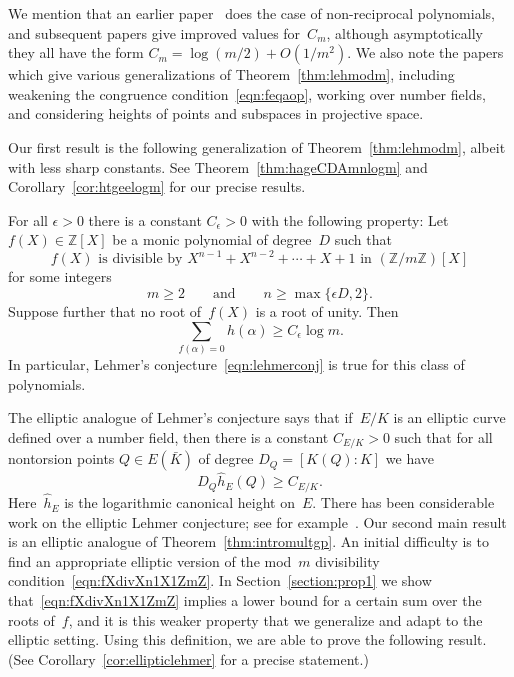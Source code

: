 We mention that an earlier paper~\cite{BoHaMo} does the case of
non-reciprocal polynomials, and subsequent papers
\cite{DuMo,GaIsMoPiWi} give improved values for~$C_m$, although
asymptotically they all have the form $C_m=\log(m/2) + O(1/m^2)$.
We also note the papers~\cite{MR2313990,MR2496463} which give various
generalizations of Theorem~\ref{thm:lehmodm}, including weakening the
congruence condition~\eqref{eqn:feqaop}, working over number fields,
and considering heights of points and subspaces in projective space.

Our first result is the following generalization of
Theorem~\ref{thm:lehmodm}, albeit with less sharp constants.  See
Theorem~\ref{thm:hageCDAmnlogm} and Corollary~\ref{cor:htgeelogm} for
our precise results.

\begin{theorem}
\label{thm:intromultgp}
For all ${\epsilon}>0$ there is a constant $C_{\epsilon}>0$ with the following
property\textup: Let $f(X)\in{\mathbb{Z}}[X]$ be a monic polynomial of
degree~$D$ such that
\begin{equation}
  \label{eqn:fXdivXn1X1ZmZ}
  \text{$f(X)$ is divisible by $X^{n-1}+X^{n-2}+\cdots+X+1$ in $({\mathbb{Z}}/m{\mathbb{Z}})[X]$}
\end{equation}
for some integers
\[
 m\ge2\qquad\text{and}\qquad n\ge\max\{{\epsilon} D,2\}.
\]
Suppose further that no root of~$f(X)$ is a root of unity. Then
\[
  \sum_{f({\alpha})=0} h({\alpha}) \ge C_{\epsilon}\log m.
\]
In particular, Lehmer's conjecture~\eqref{eqn:lehmerconj} is true for this
class of polynomials.
\end{theorem}

The elliptic analogue of Lehmer's conjecture says that if~$E/K$
is an elliptic curve defined over a number field, then there
is a constant $C_{E/K}>0$ such that for all nontorsion 
points $Q\in E({{\bar K}})$ of degree $D_Q=[K(Q):K]$ we have
\begin{equation}
  \label{eqn:ellipticlehmer}
  D_Q {{\hat h}}_E(Q) \ge C_{E/K}.
\end{equation}
Here~${{\hat h}}_E$ is the logarithmic canonical height on~$E$.  There has
been considerable work on the elliptic Lehmer conjecture; see for
example~\cite{HiSi2,Laur,Mass}.  Our second main result is an elliptic
analogue of Theorem~\ref{thm:intromultgp}.  An initial difficulty is
to find an appropriate elliptic version of the mod~$m$ divisibility
condition~\eqref{eqn:fXdivXn1X1ZmZ}. In Section~\ref{section:prop1} we
show that~\eqref{eqn:fXdivXn1X1ZmZ} implies a lower bound for a
certain sum over the roots of~$f$, and it is this weaker property that
we generalize and adapt to the elliptic setting. Using this
definition, we are able to prove the following result.  (See
Corollary~\ref{cor:ellipticlehmer} for a precise statement.)

